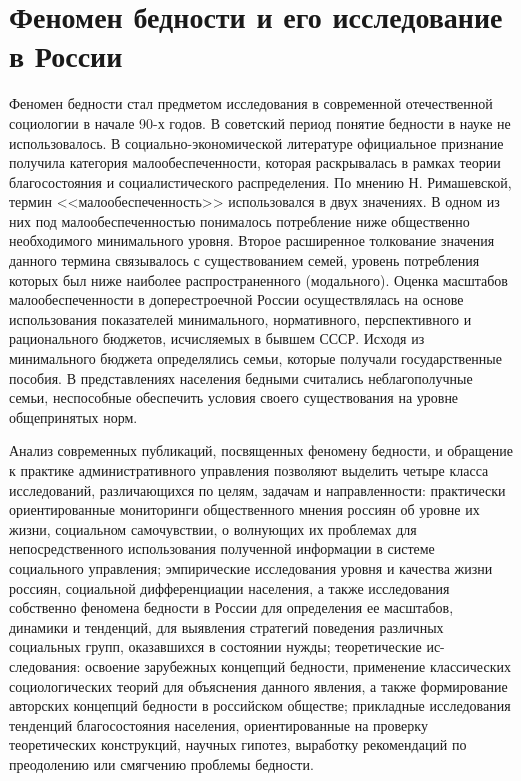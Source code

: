 \chapter{Феномен бедности и его исследование в России}
Феномен бедности стал предметом исследования в современной отечественной 
социологии в начале 90-х годов. В советский период понятие бедности в науке 
не использовалось. В социально-экономической литературе официальное признание 
получила категория малообеспеченности, которая раскрывалась в рамках теории 
благосостояния и социалистического распределения. По мнению Н. Римашевской, 
термин <<малообеспеченность>> использовался в двух значениях. В одном из них под 
малообеспеченностью понималось потребление ниже общественно необходимого 
минимального уровня. Второе расширенное толкование значения данного термина 
связывалось с существованием семей, уровень потребления которых был ниже 
наиболее распространенного (модального). Оценка масштабов малообеспеченности 
в доперестроечной России осуществлялась на основе использования показателей 
минимального, нормативного, перспективного и рационального бюджетов, 
исчисляемых в бывшем СССР. Исходя из минимального бюджета определялись 
семьи, которые получали государственные пособия. В представлениях населения 
бедными считались неблагополучные семьи, неспособные обеспечить условия 
своего существования на уровне общепринятых норм.

Анализ современных публикаций, посвященных феномену бедности, и обращение к 
практике административного управления позволяют выделить четыре класса 
исследований, различающихся по целям, задачам и направленности: практически 
ориентированные мониторинги общественного мнения россиян об уровне их жизни, 
социальном самочувствии, о волнующих их проблемах для непосредственного 
использования полученной информации в системе социального управления; 
эмпирические исследования уровня и качества жизни россиян, социальной 
дифференциации населения, а также исследования собственно феномена бедности в 
России для определения ее масштабов, динамики и тенденций, для выявления 
стратегий поведения различных социальных групп, оказавшихся в состоянии нужды; 
теоретические ис-следования: освоение зарубежных концепций бедности, 
применение классических социологических теорий для объяснения данного явления, 
а также формирование авторских концепций бедности в российском обществе; 
прикладные исследования тенденций благосостояния населения, ориентированные 
на проверку теоретических конструкций, научных гипотез, выработку рекомендаций 
по преодолению или смягчению проблемы бедности.

